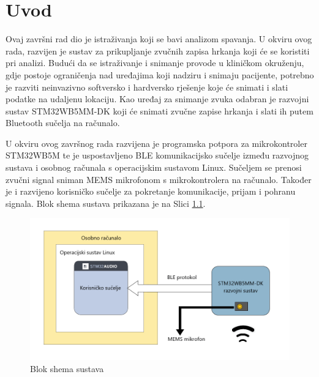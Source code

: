 \chapter{Uvod}


Ovaj završni rad dio je istraživanja koji se bavi analizom spavanja. U okviru ovog rada, razvijen je sustav za prikupljanje zvučnih zapisa hrkanja koji će se koristiti pri analizi. Budući da se istraživanje i snimanje provode u kliničkom okruženju, gdje postoje ograničenja nad uređajima koji nadziru i snimaju pacijente, potrebno je razviti neinvazivno softversko i hardversko rješenje koje će snimati i slati podatke na udaljenu lokaciju. Kao uređaj za snimanje zvuka odabran je razvojni sustav STM32WB5MM-DK koji će snimati zvučne zapise hrkanja i slati ih putem Bluetooth sučelja na računalo.  

U okviru ovog završnog rada razvijena je programska potpora za mikrokontroler STM32WB5M te je uspostavljeno BLE komunikacijsko sučelje između razvojnog sustava i osobnog računala s operacijskim sustavom Linux. Sučeljem se prenosi zvučni signal sniman MEMS mikrofonom s mikrokontrolera na računalo. Također je i razvijeno korisničko sučelje za pokretanje komunikacije, prijam i pohranu signala. Blok shema sustava prikazana je na Slici \ref{fig:shema}. 

\begin{figure}[ht]
	\includegraphics[width=\linewidth]{imgs/shema}
	\caption{Blok shema sustava}
	 \label{fig:shema}
\end{figure}

\eject